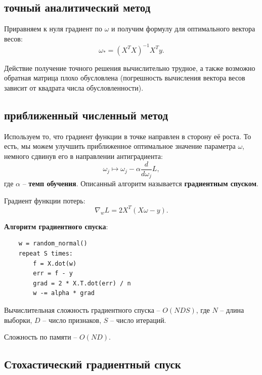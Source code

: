 \documentclass[a4paper, 10pt, openany]{book} %
\begin{document}
	\subsection{точный аналитический метод}
	
	Приравняем к нуля градиент по $\omega$ и получим формулу для оптимального вектора весов:
	\begin{equation*}
		\omega_* = \left(X^T X\right)^{-1} X^T y.
	\end{equation*}
	
	Действие получение точного решения вычислительно трудное, а также возможно обратная матрица плохо обусловлена (погрешность вычисления вектора весов зависит от квадрата 	числа обусловленности).
	
	\subsection{приближенный численный метод}
	
	 Используем то, что градиент функции в точке направлен в сторону её роста. То есть, мы можем улучшить приближенное оптимальное значение параметра $\omega$, немного сдвинув его в направлении антиградиента:
	 \begin{equation*}
	 	\omega_j \mapsto \omega_j - \alpha \frac{d}{d \omega_j} L,
	 \end{equation*}
 	где $\alpha$ -- \textbf{темп обучения}. Описанный алгоритм называется \textbf{градиентным спуском}.
 	
 	Градиент функции потерь:
 	\begin{equation*}
 		\nabla_w L = 2 X^T \left(X\omega - y\right).
 	\end{equation*}
	 
	 \textbf{Алгоритм градиентного спуска}:
	 \begin{lstlisting}
	w = random_normal()
	repeat S times:
	    f = X.dot(w)
	    err = f - y
	    grad = 2 * X.T.dot(err) / n
	    w -= alpha * grad
	 \end{lstlisting}
 
 	Вычислительная сложность градиентного спуска -- $O(NDS)$, где $N$ -- длина выборки, $D$ -- число признаков, $S$ -- число итераций.
 	
 	Сложность по памяти -- $O(ND)$.
 	
 	\subsection{Стохастический градиентный спуск}
 	
\end{document}
